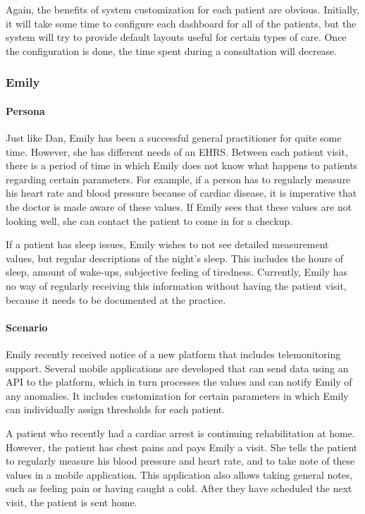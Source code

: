         \noindent Again, the benefits of system customization for each patient are obvious. Initially, it will take some time to configure each dashboard for all of the patients, but the system will try to provide default layouts useful for certain types of care. Once the configuration is done, the time spent during a consultation will decrease.
        
        \subsubsection{Emily}

        \paragraph{Persona} Just like Dan, Emily has been a successful general practitioner for quite some time. However, she has different needs of an EHRS. Between each patient visit, there is a period of time in which Emily does not know what happens to patients regarding certain parameters. For example, if a person has to regularly measure his heart rate and blood pressure because of cardiac disease, it is imperative that the doctor is made aware of these values. If Emily sees that these values are not looking well, she can contact the patient to come in for a checkup.

        If a patient has sleep issues, Emily wishes to not see detailed measurement values, but regular descriptions of the night’s sleep. This includes the hours of sleep, amount of wake-ups, subjective feeling of tiredness. Currently, Emily has no way of regularly receiving this information without having the patient visit, because it needs to be documented at the practice.
        
        \paragraph{Scenario} Emily recently received notice of a new platform that includes telemonitoring support. Several mobile applications are developed that can send data using an API to the platform, which in turn processes the values and can notify Emily of any anomalies. It includes customization for certain parameters in which Emily can individually assign thresholds for each patient.

        A patient who recently had a cardiac arrest is continuing rehabilitation at home. However, the patient has chest pains and pays Emily a visit. She tells the patient to regularly measure his blood pressure and heart rate, and to take note of these values in a mobile application. This application also allows taking general notes, such as feeling pain or having caught a cold. After they have scheduled the next visit, the patient is sent home.
        

